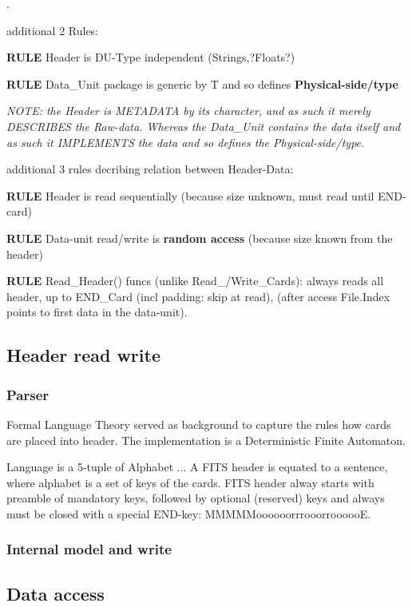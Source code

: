 \documentclass[a4paper,10pt]{article}
\begin{document}
.

additional 2 Rules:

\textbf{RULE} Header is DU-Type independent (Strings,?Floats?)

\textbf{RULE} Data\_Unit package is generic by T and so defines \textbf{Physical-side/type}

\textit{NOTE: the Header is METADATA by its character, and as such it merely DESCRIBES
the Raw-data. Whereas the Data\_Unit contains the data itself and as such it IMPLEMENTS
the data and so defines the Physical-side/type.}

additional 3 rules decribing relation between Header-Data:

\textbf{RULE} Header is read sequentially (because size unknown, must read until END-card)

\textbf{RULE} Data-unit read/write is \textbf{random access} (because size known from the header)

\textbf{RULE} Read\_Header() funcs (unlike Read\_/Write\_Cards):
always reads all header, up to END\_Card (incl padding: skip at read), (after access
File.Index points to first data in the data-unit).





\subsection{Header read write}

\subsubsection{Parser}

Formal Language Theory served as background to capture the rules how cards are placed 
into header. The implementation is a Deterministic Finite Automaton.

Language is a 5-tuple of Alphabet ...
A FITS header is equated to a sentence, where alphabet is a set of keys of the cards.
FITS header alway starts with preamble of mandatory keys, followed by optional (reserved) keys
and always must be closed with a special END-key: MMMMMoooooorrrooorroooooE.


\subsubsection{Internal model and write}



\subsection{Data access}
\end{document}
